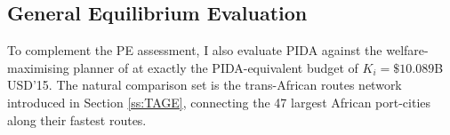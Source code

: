 \documentclass[a4paper]{article}
\begin{document}


\subsection{General Equilibrium Evaluation} \label{sec:GE_PIDA}

To complement the PE assessment, I also evaluate PIDA against the welfare-maximising planner of \citet{fajgelbaum2020optimal} at exactly the PIDA-equivalent budget of $K_i = \$10.089$B USD'15. The natural comparison set is the trans-African routes network introduced in Section \ref{ss:TAGE}, connecting the 47 largest African port-cities along their fastest routes.  \newline %
\end{document}
